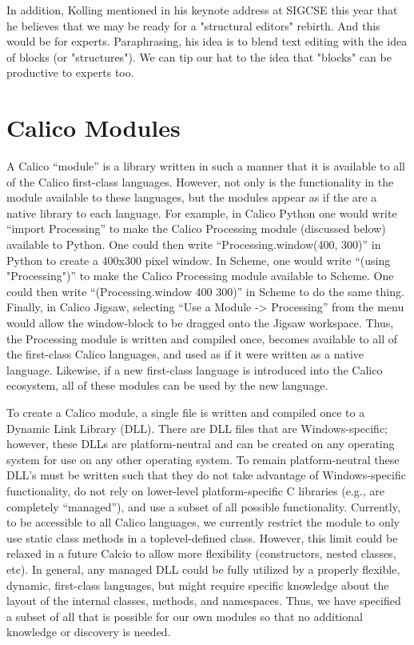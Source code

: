 \documentclass[preprint]{sigplanconf}
\begin{document}
In addition, Kolling mentioned in his keynote address at SIGCSE this
year that he believes that we may be ready for a "structural editors"
rebirth. And this would be for experts. Paraphrasing, his idea is to
blend text editing with the idea of blocks (or "structures"). We can
tip our hat to the idea that "blocks" can be productive to experts
too.

\section{Calico Modules}

A Calico ``module'' is a library written in such a manner that it is
available to all of the Calico first-class languages. However, not
only is the functionality in the module available to these languages,
but the modules appear as if the are a native library to each
language. For example, in Calico Python one would write ``import
Processing'' to make the Calico Processing module (discussed below)
available to Python. One could then write ``Processing.window(400,
300)'' in Python to create a 400x300 pixel window. In Scheme, one
would write ``(using "Processing")'' to make the Calico Processing
module available to Scheme. One could then write ``(Processing.window
400 300)'' in Scheme to do the same thing. Finally, in Calico Jigsaw,
selecting ``Use a Module -> Processing'' from the menu would allow the
window-block to be dragged onto the Jigsaw workspace. Thus, the
Processing module is written and compiled once, becomes available to
all of the first-class Calico languages, and used as if it were
written as a native language. Likewise, if a new first-class language
is introduced into the Calico ecosystem, all of these modules can be
used by the new language.

To create a Calico module, a single file is written and compiled once
to a Dynamic Link Library (DLL). There are DLL files that are
Windows-specific; however, these DLLs are platform-neutral and can be
created on any operating system for use on any other operating
system. To remain platform-neutral these DLL's must be written such
that they do not take advantage of Windows-specific functionality, do
not rely on lower-level platform-specific C libraries (e.g., are
completely ``managed''), and use a subset of all possible
functionality. Currently, to be accessible to all Calico languages, we
currently restrict the module to only use static class methods in a
toplevel-defined class. However, this limit could be relaxed in a
future Calcio to allow more flexibility (constructors, nested classes,
etc). In general, any managed DLL could be fully utilized by a
properly flexible, dynamic, first-class languages, but might require
specific knowledge about the layout of the internal classes, methods,
and namespaces. Thus, we have specified a subset of all that is
possible for our own modules so that no additional knowledge or
discovery is needed.
\end{document}
